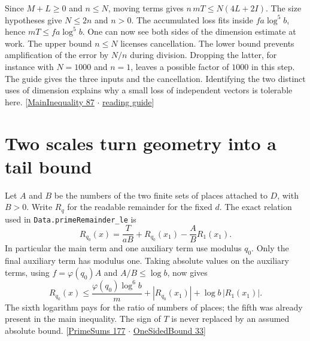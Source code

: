 \documentclass[12pt,letterpaper]{article}
\newcommand{\id}[1]{{\small\nolinkurl{#1}}}
\begin{document}
Since $M+L\ge0$ and $n\le N$, moving terms gives $n\,mT\le N(4L+2I)$. The size hypotheses give $N\le2n$ and $n>0$. The accumulated loss fits inside $f a\log^5 b$, hence $mT\le f a\log^5 b$. One can now see both sides of the dimension estimate at work. The upper bound $n\le N$ licenses cancellation. The lower bound prevents amplification of the error by $N/n$ during division. Dropping the latter, for instance with $N=1000$ and $n=1$, leaves a possible factor of $1000$ in this step. The guide gives the three inputs and the cancellation. Identifying the two distinct uses of dimension explains why a small loss of independent vectors is tolerable here. {\small\sffamily\color{mute}[\href{https://github.com/leanprover-community/riemann-hypothesis/blob/e063a923620ee7787b4a1270421478645bf66bdb/src/New/Reduction/MainInequality.lean#L87}{MainInequality 87} $\cdot$ \href{https://github.com/leanprover-community/riemann-hypothesis/blob/e063a923620ee7787b4a1270421478645bf66bdb/GUIDE.md#L1}{reading guide}]}

\section{Two scales turn geometry into a tail bound}
Let $A$ and $B$ be the numbers of the two finite sets of places attached to $D$, with $B>0$. Write $R_q$ for the readable remainder for the fixed $d$. The exact relation used in \id{Data.primeRemainder_le} is
\[
 R_{q_0}(x)=\frac{T}{aB}+R_{q_0}(x_1)-\frac AB R_1(x_1).
\]
In particular the main term and one auxiliary term use modulus $q_0$. Only the final auxiliary term has modulus one. Taking absolute values on the auxiliary terms, using $f=\varphi(q_0)A$ and $A/B\le\log b$, now gives
\[
 R_{q_0}(x)\le \frac{\varphi(q_0)\log^6 b}{m}
          +|R_{q_0}(x_1)|+\log b\,|R_1(x_1)|.
\]
The sixth logarithm pays for the ratio of numbers of places; the fifth was already present in the main inequality. The sign of $T$ is never replaced by an assumed absolute bound. {\small\sffamily\color{mute}[\href{https://github.com/leanprover-community/riemann-hypothesis/blob/e063a923620ee7787b4a1270421478645bf66bdb/src/New/Reduction/PrimeSums.lean#L177}{PrimeSums 177} $\cdot$ \href{https://github.com/leanprover-community/riemann-hypothesis/blob/e063a923620ee7787b4a1270421478645bf66bdb/src/New/Reduction/OneSidedBound.lean#L33}{OneSidedBound 33}]}
\end{document}
